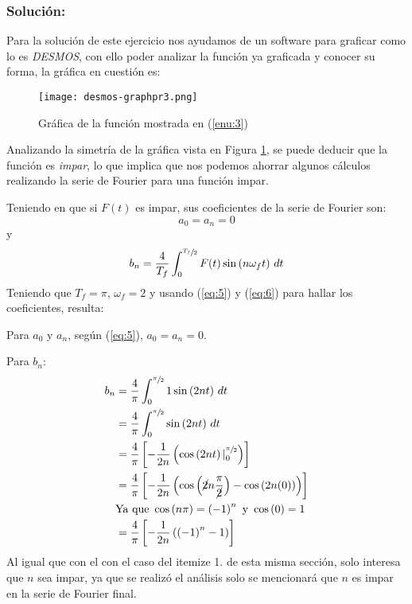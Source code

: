 \begin{multicols}{2}
\subsubsection*{\textbf{Solución:}}

Para la solución de este ejercicio nos ayudamos de un software para graficar como lo es \textit{DESMOS}, con ello poder analizar la función ya graficada y conocer su forma, la gráfica en cuestión es:

\begin{figure}[H]
\begin{center}
\texttt{[image: desmos-graphpr3.png]}
\caption{Gráfica de la función mostrada en (\ref{enu:3})}
\label{fig:graf31}
\end{center}
\end{figure}

Analizando la simetría de la gráfica vista en Figura \ref{fig:graf31}, se puede deducir que la función es \textit{impar}, lo que implica que nos podemos ahorrar algunos cálculos realizando la serie de Fourier para una función impar.

Teniendo en que si $F(t)$ es impar, sus coeficientes de la serie de Fourier son:
\begin{equation}
    a_0 = a_n = 0
    \label{eq:5}
\end{equation}
y
\begin{equation}
    b_n = \frac{4}{T_f} \int_{0}^{\sfrac{T_f}{2}} F(t)\sin\left(n \omega_f t\right) \,dt
    \label{eq:6} 
\end{equation}
Teniendo que $T_f = \pi$, $\omega_f = 2$ y usando (\ref{eq:5}) y (\ref{eq:6}) para hallar los coeficientes, resulta:

Para $a_0$ y $a_n$, según (\ref{eq:5}), $a_0 = a_n = 0$.

Para $b_n$:
\begin{align*}
    b_n &= \frac{4}{\pi} \int_{0}^{\sfrac{\pi}{2}} 1 \sin\left(2nt\right) \,dt\\
    &= \frac{4}{\pi} \int_{0}^{\sfrac{\pi}{2}} \sin\left(2nt\right) \,dt\\
    &= \frac{4}{\pi} \left[-\frac{1}{2n} \left(\cos\left(2nt\right) |^{\sfrac{\pi}{2}}_{0}\right)\right]\\
    &= \frac{4}{\pi} \left[-\frac{1}{2n} \left(\cos\left(\cancel{2}n\frac{\pi}{\cancel{2}}\right) - \cos\left(2n(0)\right)\right)\right]\\
    &\mathrm{Ya~que}~\cos\left(n\pi\right) = \left(-1\right)^{n} \mathrm{~y~} \cos\left(0\right) = 1\\
    &= \frac{4}{\pi} \left[-\frac{1}{2n}\left(\left(-1\right)^{n} - 1\right)\right]
\end{align*}
Al igual que con el con el caso del itemize 1. de esta misma sección, solo interesa que $n$ sea impar, ya que se realizó el análisis solo se mencionará que $n$ es impar en la serie de Fourier final.


\end{multicols}
